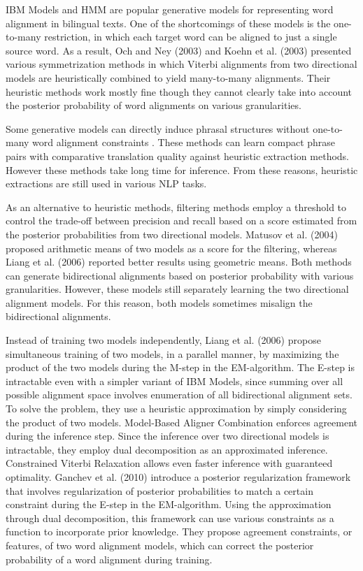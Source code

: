 \documentclass[english]{jnlp_1.4}
\begin{document}
IBM Models \cite{brown1993mathematics}  and HMM  \cite{vogel1996hmm}  are popular generative models for representing word alignment in bilingual texts.
One of the shortcomings of these models is the one-to-many restriction, in which each target word can be aligned to just a single source word.
As a result, Och and Ney (2003) and Koehn et al. (2003) presented various symmetrization methods in which  Viterbi alignments from  two directional models are heuristically combined to yield many-to-many alignments.
Their heuristic methods work mostly fine though they cannot clearly take into account the posterior probability of word alignments on various granularities.

Some generative models can directly induce phrasal structures without one-to-many word alignment constraints \cite{D08-1033,P11-1064}.
These methods can learn compact phrase pairs with comparative translation quality against heuristic extraction methods.
However these methods take long time for inference.
From these reasons, heuristic extractions are still used in various NLP tasks.

As an alternative to heuristic methods, filtering methods employ a threshold to control the trade-off between precision and recall based on a score estimated from the posterior probabilities from two directional models.
Matusov et al. (2004) proposed arithmetic means of two models as a score for the filtering, whereas Liang et al. (2006) reported better results using geometric means.
Both methods can generate bidirectional alignments based on posterior probability with various granularities.
However, these models still separately learning the two directional alignment models.
For this reason, both models sometimes misalign the bidirectional alignments.

Instead of training two models independently, Liang et al. (2006) propose simultaneous training of two models, in a parallel manner, by maximizing the product of the two models during the M-step in the EM-algorithm.
The E-step is intractable even with a simpler variant of IBM Models, since summing over all possible alignment space involves enumeration of all bidirectional alignment sets.
To solve the problem, they use a heuristic approximation by simply considering the product of two models.
Model-Based Aligner Combination \cite{denero2011model} enforces agreement during the inference step.
Since the inference over two directional models is intractable, they employ dual decomposition as an approximated inference.
Constrained Viterbi Relaxation \cite{chang2014constrained} allows even faster inference with guaranteed optimality.
Ganchev et al. (2010) introduce a posterior regularization framework that involves regularization of posterior probabilities to match a certain constraint during the E-step in the EM-algorithm.
Using the approximation through dual decomposition, this framework can use various constraints as a function to incorporate prior knowledge.
They propose agreement constraints, or features, of two word alignment models, which can correct the posterior probability of a word alignment during training.
\end{document}
